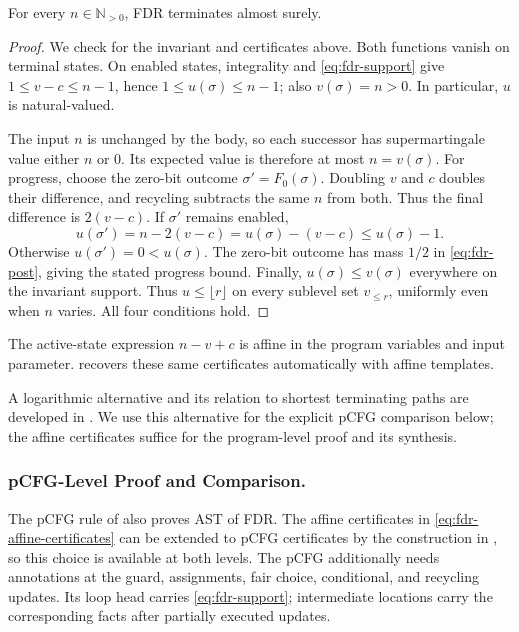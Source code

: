 \begin{theorem}
\label{thm:fdr}
For every $n\in\mathbb N_{>0}$, FDR terminates almost surely.
\end{theorem}
\begin{proof}
We check  for the invariant and certificates
above. Both functions vanish on terminal states. On enabled states,
integrality and \eqref{eq:fdr-support} give
$1\leq v-c\leq n-1$, hence $1\leq u(\sigma)\leq n-1$;
also $v(\sigma)=n>0$. In particular, $u$ is natural-valued.

The input $n$ is unchanged by the body, so each successor has
supermartingale value either $n$ or $0$. Its expected value is
therefore at most $n=v(\sigma)$.
For progress, choose the zero-bit outcome $\sigma'=F_0(\sigma)$.
Doubling $v$ and $c$ doubles their difference, and recycling subtracts
the same $n$ from both. Thus the final difference is $2(v-c)$.
If $\sigma'$ remains enabled,
\[
 u(\sigma')=n-2(v-c)=u(\sigma)-(v-c)\leq u(\sigma)-1.
\]
Otherwise $u(\sigma')=0<u(\sigma)$. The zero-bit outcome has mass
$1/2$ in \eqref{eq:fdr-post}, giving the stated progress bound.
Finally, $u(\sigma)\leq v(\sigma)$ everywhere on the invariant
support. Thus $u\leq\lfloor r\rfloor$ on every sublevel set
$v_{\leq r}$, uniformly even when $n$ varies. All four conditions hold.
\end{proof}

The active-state expression $n-v+c$ is affine in the program variables
and input parameter.  recovers these same
certificates automatically with affine templates.

A logarithmic alternative and its relation to shortest terminating paths
are developed in . We use this alternative
for the explicit pCFG comparison below; the affine certificates suffice
for the program-level proof and its synthesis.

\subsubsection{pCFG-Level Proof and Comparison.}
The pCFG rule of  also proves AST of FDR.
The affine certificates in
\eqref{eq:fdr-affine-certificates} can be extended to pCFG certificates
by the construction in , so this choice is
available at both levels. The pCFG additionally needs annotations at
the guard, assignments, fair choice, conditional, and recycling updates.
Its loop head carries \eqref{eq:fdr-support}; intermediate locations
carry the corresponding facts after partially executed updates.

